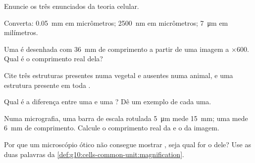 \begin{exercise}[$\star$]\label{exo:g10:cells-common-unit:1}
Enuncie os três enunciados da teoria celular.
\end{exercise}

\begin{exercise}[$\star$]\label{exo:g10:cells-common-unit:2}
Converta: \qty{0.05}{mm} em micrômetros; \qty{2500}{nm} em micrômetros;
\qty{7}{\micro m} em milímetros.
\end{exercise}

\begin{exercise}[$\star$]\label{exo:g10:cells-common-unit:3}
Uma  é desenhada com \qty{36}{mm} de comprimento a partir de uma
imagem a $\times 600$. Qual é o comprimento real dela?
\end{exercise}

\begin{exercise}[$\star$]\label{exo:g10:cells-common-unit:4}
Cite três estruturas presentes numa  vegetal e ausentes numa
 animal, e uma estrutura presente em toda .
\end{exercise}

\begin{exercise}[$\star$]\label{exo:g10:cells-common-unit:5}
Qual é a diferença entre uma  e uma ? Dê um exemplo de cada uma.
\end{exercise}

\begin{exercise}[$\star\star$]\label{exo:g10:cells-common-unit:6}
Numa micrografia, uma barra de escala rotulada \qty{5}{\micro m} mede
\qty{15}{mm}; uma  mede \qty{6}{mm} de comprimento. Calcule
o comprimento real da  e o  da imagem.
\end{exercise}

\begin{exercise}[$\star\star$]\label{exo:g10:cells-common-unit:7}
Por que um microscópio ótico não consegue mostrar , seja
qual for o  dele? Use as duas palavras da
\cref{def:g10:cells-common-unit:magnification}.
\end{exercise}

